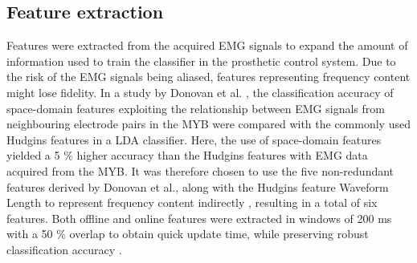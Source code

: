 \subsection{Feature extraction}
Features were extracted from the acquired EMG signals to expand the amount of information used to train the classifier in the prosthetic control system. Due to the risk of the EMG signals being aliased, features representing frequency content might lose fidelity. In a study by Donovan et al. \cite{Donovan2017}, the classification accuracy of space-domain features exploiting the relationship between EMG signals from neighbouring electrode pairs in the MYB were compared with the commonly used Hudgins features in a LDA classifier. Here, the use of space-domain features yielded a 5 $\%$ higher accuracy than the Hudgins features with EMG data acquired from the MYB. It was therefore chosen to use the five non-redundant features derived by Donovan et al., along with the Hudgins feature Waveform Length to represent frequency content indirectly \cite{Hudgins1993}, resulting in a total of six features. Both offline and online features were extracted in windows of 200 ms with a 50 $\%$ overlap to obtain quick update time, while preserving robust classification accuracy \cite{Menon2017}. 
